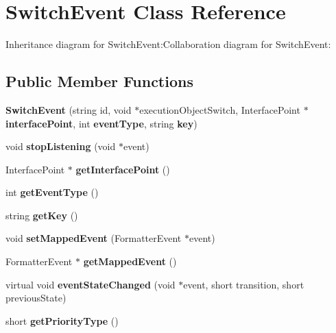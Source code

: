 \section{SwitchEvent Class Reference}
\label{classbr_1_1pucrio_1_1telemidia_1_1ginga_1_1ncl_1_1model_1_1switches_1_1SwitchEvent}
Inheritance diagram for SwitchEvent:Collaboration diagram for SwitchEvent:\subsection*{Public Member Functions}
\begin{CompactItemize}
\item 
\textbf{SwitchEvent} (string id, void $\ast$executionObjectSwitch, InterfacePoint $\ast${\bf interfacePoint}, int {\bf eventType}, string {\bf key})\label{classbr_1_1pucrio_1_1telemidia_1_1ginga_1_1ncl_1_1model_1_1switches_1_1SwitchEvent_e25933b6b80aa90eb30ed7c543dabd7c}

\item 
void \textbf{stopListening} (void $\ast$event)\label{classbr_1_1pucrio_1_1telemidia_1_1ginga_1_1ncl_1_1model_1_1switches_1_1SwitchEvent_30fe02416806f60f10cfcc8e42cbefb3}

\item 
InterfacePoint $\ast$ \textbf{getInterfacePoint} ()\label{classbr_1_1pucrio_1_1telemidia_1_1ginga_1_1ncl_1_1model_1_1switches_1_1SwitchEvent_17014aedf8e9a22aebbbaf254238a7df}

\item 
int \textbf{getEventType} ()\label{classbr_1_1pucrio_1_1telemidia_1_1ginga_1_1ncl_1_1model_1_1switches_1_1SwitchEvent_c99931b4c55baf09988429ba8de2e11c}

\item 
string \textbf{getKey} ()\label{classbr_1_1pucrio_1_1telemidia_1_1ginga_1_1ncl_1_1model_1_1switches_1_1SwitchEvent_be82c21243d3be437de024a80d1b751f}

\item 
void \textbf{setMappedEvent} (FormatterEvent $\ast$event)\label{classbr_1_1pucrio_1_1telemidia_1_1ginga_1_1ncl_1_1model_1_1switches_1_1SwitchEvent_b917d9bd76d9d854c451e3e0bb7e36af}

\item 
FormatterEvent $\ast$ \textbf{getMappedEvent} ()\label{classbr_1_1pucrio_1_1telemidia_1_1ginga_1_1ncl_1_1model_1_1switches_1_1SwitchEvent_e76b30133c14743b3ec04e142bdcd55f}

\item 
virtual void \textbf{eventStateChanged} (void $\ast$event, short transition, short previousState)\label{classbr_1_1pucrio_1_1telemidia_1_1ginga_1_1ncl_1_1model_1_1switches_1_1SwitchEvent_620cd8995737df722bbbf897b13a97dc}

\item 
short \textbf{getPriorityType} ()\label{classbr_1_1pucrio_1_1telemidia_1_1ginga_1_1ncl_1_1model_1_1switches_1_1SwitchEvent_ae7d2f7d0ac4466813deee19bbea7ebe}

\end{CompactItemize}
